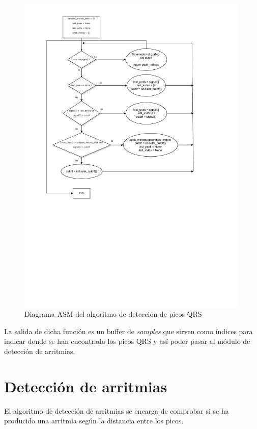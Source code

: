 \begin{figure}[h!]
	\centering
    \includegraphics[width=0.99\textwidth]{./Images/img_algoritmo/Diagramapicos.pdf}
    \caption{Diagrama ASM del algoritmo de detección de picos QRS}
    \label{fig:diagramapicos}
\end{figure} 

\FloatBarrier
La salida de dicha función es un buffer de \textit{samples} que sirven como índices para indicar donde se han encontrado
los picos QRS y así poder pasar al módulo de detección de arritmias.

\section{Detección de arritmias}

El algoritmo de detección de arritmias se encarga de comprobar si se ha producido una arritmia según la
distancia entre los picos.

